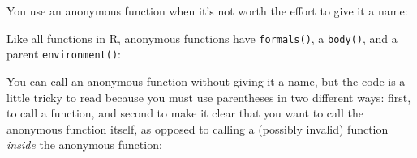 You use an anonymous function when it's not worth the effort to give it
a name:

\begin{Shaded}
\begin{Highlighting}[]
\NormalTok{(}
\StringTok{ }\NormalTok{, }
\end{Highlighting}
\end{Shaded}

Like all functions in R, anonymous functions have \texttt{formals()}, a
\texttt{body()}, and a parent \texttt{environment()}:

\begin{Shaded}
\begin{Highlighting}[]
 \NormalTok{) }\StringTok{ }
 \NormalTok{) }\StringTok{ }
 \NormalTok{) }\StringTok{ }
\end{Highlighting}
\end{Shaded}

You can call an anonymous function without giving it a name, but the
code is a little tricky to read because you must use parentheses in two
different ways: first, to call a function, and second to make it clear
that you want to call the anonymous function itself, as opposed to
calling a (possibly invalid) function \emph{inside} the anonymous
function:

\begin{Shaded}
\begin{Highlighting}[]
\NormalTok{()}

\NormalTok{)()}

\StringTok{ }\NormalTok{)(}\NormalTok{)}

\StringTok{ }\StringTok{ }
\NormalTok{(}\NormalTok{)}
\end{Highlighting}
\end{Shaded}

